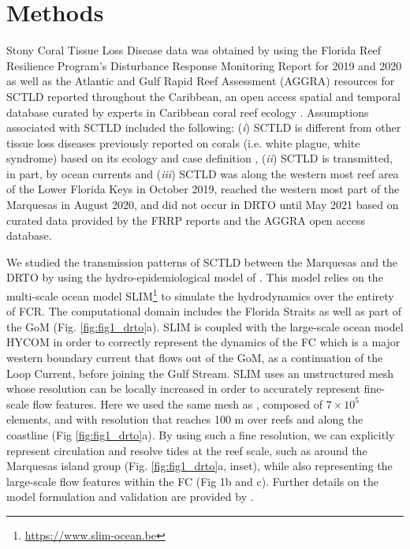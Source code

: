 \section{Methods}
Stony Coral Tissue Loss Disease data was obtained by using the Florida Reef Resilience Program's Disturbance Response Monitoring Report for 2019 and 2020 \citep{frrp2019,frrp2020} as well as the Atlantic and Gulf Rapid Reef Assessment (AGGRA) resources for SCTLD reported throughout the Caribbean, an open access spatial and temporal database curated by experts in Caribbean coral reef ecology \citep{kramer2019map}. Assumptions associated with SCTLD included the following: (\textit{i}) SCTLD is different from other tissue loss diseases previously reported on corals (i.e. white plague, white syndrome) based on its ecology and case definition \citep{noaa2018}, (\textit{ii}) SCTLD is transmitted, in part, by ocean currents \citep{aeby2019pathogenesis, muller2020spatial,eaton2021measuring} and (\textit{iii}) SCTLD was along the western most reef area of the Lower Florida Keys in October 2019, reached the western most part of the Marquesas in August 2020, and did not occur in DRTO until May 2021 based on curated data provided by the FRRP reports and the AGGRA open access database.

We studied the transmission patterns of SCTLD between the Marquesas and the DRTO by using the hydro-epidemiological model of \cite{dobbelaere2020coupled}. This model relies on the multi-scale ocean model SLIM\footnote{\url{ https://www.slim-ocean.be}} to simulate the hydrodynamics over the entirety of FCR. The computational domain includes the Florida Straits as well as part of the GoM (Fig. \ref{fig:fig1_drto}a). SLIM is coupled with the large-scale ocean model HYCOM in order to correctly represent the dynamics of the FC which is a major western boundary current that flows out of the GoM, as a continuation of the Loop Current, before joining the Gulf Stream. SLIM uses an unstructured mesh whose resolution can be locally increased in order to accurately represent fine-scale flow features. Here we used the same mesh as \cite{dobbelaere2020coupled}, composed of $7\times 10^5$ elements, and with resolution that reaches 100 m over reefs and along the coastline (Fig \ref{fig:fig1_drto}a). By using such a fine resolution, we can explicitly represent circulation and resolve tides at the reef scale, such as around the Marquesas island group (Fig. \ref{fig:fig1_drto}a, inset), while also representing the large-scale flow features within the FC (Fig 1b and c). Further details on the model formulation and validation are provided by \cite{frys2020fine}.

